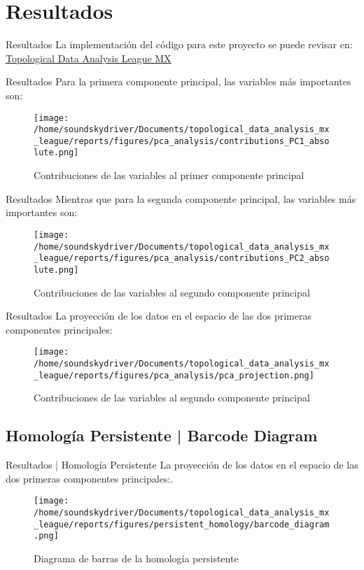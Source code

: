 \documentclass[11pt]{beamer}
\begin{document}
	\section{Resultados}
		\begin{frame}{Resultados}
			\justifying
			La implementación del código para este proyecto se puede revisar en:
            \centering
            \href{https://github.com/erick-rios/topological_data_analysis_mx_league}{Topological Data Analysis League MX}
		\end{frame}
		
		\begin{frame}{Resultados}
			\justifying
			Para la primera componente principal, las variables más importantes son:
			\begin{figure}[H]
				\centering
				\texttt{[image: /home/soundskydriver/Documents/topological\_data\_analysis\_mx\_league/reports/figures/pca\_analysis/contributions\_PC1\_absolute.png]}
				\caption{Contribuciones de las variables al primer componente principal}
                \label{fig: Figura1}
			\end{figure}
		\end{frame}
        \begin{frame}{Resultados}
			\justifying
            Mientras que para la segunda componente principal, las variables más importantes son:
            \begin{figure}[H]
				\centering
				\texttt{[image: /home/soundskydriver/Documents/topological\_data\_analysis\_mx\_league/reports/figures/pca\_analysis/contributions\_PC2\_absolute.png]}
				\caption{Contribuciones de las variables al segundo componente principal}
                \label{fig: Figura2}
			\end{figure}
		\end{frame}
        \begin{frame}{Resultados}
			\justifying
            La proyección de los datos en el espacio de las dos primeras componentes principales:
            \begin{figure}[H]
				\centering
				\texttt{[image: /home/soundskydriver/Documents/topological\_data\_analysis\_mx\_league/reports/figures/pca\_analysis/pca\_projection.png]}
				\caption{Contribuciones de las variables al segundo componente principal}
                \label{fig: Figura3}
			\end{figure}
		\end{frame}
        \subsection{Homología Persistente | Barcode Diagram}
        \begin{frame}{Resultados | Homología Persistente}
			\justifying
            La proyección de los datos en el espacio de las dos primeras componentes principales:.
            \begin{figure}[H]
				\centering
				\texttt{[image: /home/soundskydriver/Documents/topological\_data\_analysis\_mx\_league/reports/figures/persistent\_homology/barcode\_diagram.png]}
				\caption{Diagrama de barras de la homología persistente}
                \label{fig: Figura4}
			\end{figure}
        \end{frame}
\end{document}
